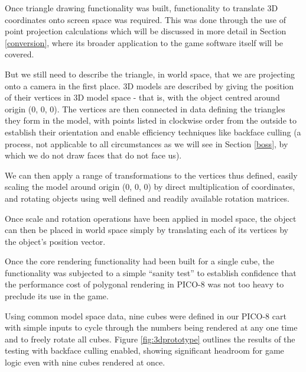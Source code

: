 \documentclass[11pt]{article}
\begin{document}

Once triangle drawing functionality was built, functionality to translate 3D coordinates onto
screen space was required. This was done through the use of point projection calculations which
will be discussed in more detail in Section \ref{conversion},
where its broader application to the game software itself will be covered.


But we still need to describe the triangle, in world space, that we are projecting onto a camera in the
first place. 3D models are described by giving the position of their vertices in 3D model space - that is,
with the object centred around origin (0, 0, 0). The vertices are then connected
in data defining the triangles they form in the model, with points listed in clockwise order from
the outside to establish their orientation and enable efficiency techniques like backface culling
(a process, not applicable to all circumstances as we will see in Section \ref{boss}, by which we
do not draw faces that do not face us).

We can then apply a range of transformations to the vertices thus defined, easily scaling
the model around origin (0, 0, 0) by direct multiplication of coordinates, and rotating
objects using well defined and readily available rotation matrices.

Once scale and rotation operations have been applied in model space, the object can then be
placed in world space simply by translating each of its vertices by the object's position vector.

Once the core rendering functionality had been built for a single cube, the functionality
was subjected to a simple ``sanity test'' to establish confidence that the performance
cost of polygonal rendering in PICO-8 was not too heavy to preclude its use in the
game.

Using common model space data, nine cubes were defined in our PICO-8 cart with simple inputs
to cycle through the numbers being rendered at any one time and to freely rotate all cubes.
Figure \ref{fig:3dprototype} outlines the results of the testing with backface culling enabled, showing
significant headroom for game logic even with nine cubes rendered at once.
\end{document}
